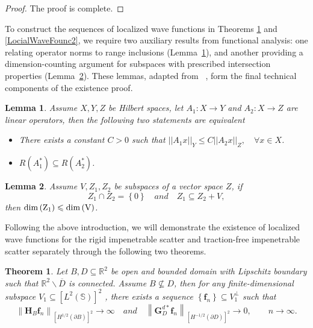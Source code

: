 \documentclass[11pt,reqno,twoside]{amsart}
\newtheorem{thm}{Theorem}[section]
\newtheorem{lem}{Lemma}[section]
\theoremstyle{definition}
\theoremstyle{remark}
\numberwithin{equation}{section}
\begin{document}
\begin{proof}
	The proof is complete.	
	\end{proof}

To construct the sequences of localized wave functions in Theorems \ref{LocialWaveFounc} and \ref{LocialWaveFounc2}, we require two auxiliary results from functional analysis: one relating operator norms to range inclusions (Lemma~\ref{Inquallity}), and another providing a dimension-counting argument for subspaces with prescribed intersection properties (Lemma~\ref{Dim}). These lemmas, adapted from ~\cite{HPS19b}, form the final technical components of the existence proof.

\begin{lem}\label{Inquallity}
	Assume $X, Y, Z$ be Hilbert spaces, let $A_1:X \to Y$ and $A_2: X \to Z$ are linear operators, then the following two statements are equivalent
	\begin{itemize}
		\item [(1).] There exists a constant $C>0$ such that $||A_1 x||_Y \leq C ||A_2 x||_Z, \quad \forall x \in X$.
		\item [(2).] $R \left( A^*_1 \right) \subseteq R \left( A^*_2 \right) $.
	\end{itemize}
\end{lem}

\begin{lem}\label{Dim}
	Assume $V, Z_1, Z_2 $ be subspaces of a vector space $Z$, if 
	$$
	Z_1 \cap Z_2= \left\lbrace 0 \right\rbrace \quad and \quad Z_1 \subseteq Z_2 +V,
	$$
	then $\rm {dim}\left(  Z_1 \right) \leqslant \rm {dim}\left(  V \right) $.
\end{lem}

Following the above introduction, we will demonstrate the existence of localized wave functions for the rigid impenetrable scatter and traction-free impenetrable scatter separately through the following two theorems.

\begin{thm}\label{LocialWaveFounc}
 Let $B, D  \subseteq \mathbb R^2$ be open and bounded domain with  Lipschitz boundary such that $\mathbb R^2 \backslash \overline {D}$ is connected. Assume $B \nsubseteq D$, then for any finite-dimensional subspace $V_1 \subseteq \left[L^{2}\left(\mathbb S\right) \right] ^2 $ , there exists a sequence $\left\lbrace  \mathbf f_n \right\rbrace  \subseteq  V_1^{\perp} $ such that
 $$
 \left\|\mathbf H_B \mathbf f_n\right\|_{\left[H^{1/2}\left(\partial B\right) \right] ^2 } \to \infty \quad and \quad \left\| \mathbf G_D^{d*} \mathbf f_n\right\|_{\left[H^{-1/2}\left(\partial D\right) \right] ^2 } \to 0, \qquad n\to \infty.
 $$
\end{thm}
\end{document}
